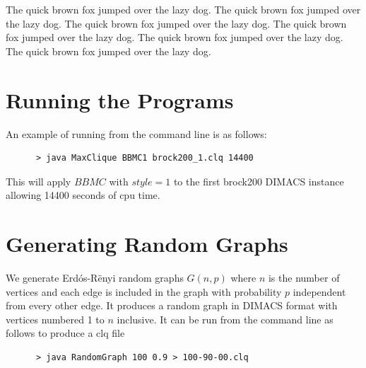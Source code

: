 \documentclass{l4proj}
\begin{document}
The quick brown fox jumped over the lazy dog.
The quick brown fox \cite{am97} jumped over the lazy dog.
The quick brown fox jumped over the lazy dog.
The quick brown fox jumped over the lazy dog.
The quick brown fox jumped over the lazy dog.
The quick brown fox jumped over the lazy dog.

\begin{appendices}

\chapter{Running the Programs}
An example of running from the command line is as follows:
\begin{verbatim}
      > java MaxClique BBMC1 brock200_1.clq 14400
\end{verbatim}
This will apply $BBMC$ with $style = 1$ to the first brock200 DIMACS instance allowing 14400 seconds of cpu time.

\chapter{Generating Random Graphs}
\label{sec:randomGraph}
We generate Erd\'{o}s-R\"{e}nyi random graphs $G(n,p)$ where $n$ is the number of vertices and
each edge is included in the graph with probability $p$ independent from every other edge. It produces
a random graph in DIMACS format with vertices numbered 1 to $n$ inclusive. It can be run from the command line as follows to produce
a clq file
\begin{verbatim}
      > java RandomGraph 100 0.9 > 100-90-00.clq
\end{verbatim}
\end{appendices}




\end{document}
